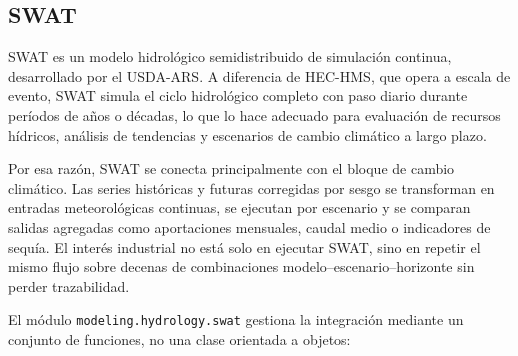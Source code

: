\subsection{SWAT}

SWAT \parencite{arnold1998swat,gassman2007swat} es un modelo hidrológico semidistribuido de simulación continua, desarrollado por el USDA-ARS. A diferencia de HEC-HMS, que opera a escala de evento, SWAT simula el ciclo hidrológico completo con paso diario durante períodos de años o décadas, lo que lo hace adecuado para evaluación de recursos hídricos, análisis de tendencias y escenarios de cambio climático a largo plazo.

Por esa razón, SWAT se conecta principalmente con el bloque de cambio climático. Las series históricas y futuras corregidas por sesgo se transforman en entradas meteorológicas continuas, se ejecutan por escenario y se comparan salidas agregadas como aportaciones mensuales, caudal medio o indicadores de sequía. El interés industrial no está solo en ejecutar SWAT, sino en repetir el mismo flujo sobre decenas de combinaciones modelo--escenario--horizonte sin perder trazabilidad.

El módulo \texttt{modeling.hydrology.swat} gestiona la integración mediante un conjunto de funciones, no una clase orientada a objetos:

